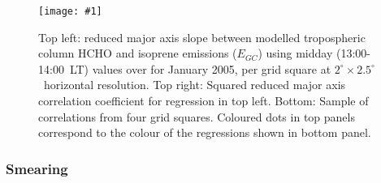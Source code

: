 \documentclass[acp, manuscript]{copernicus}
\newcommand{\apri}{E_{GC}} %
\newcommand{\lowhr}{$2^{\circ} \times 2.5^{\circ}$}
\newcommand{\mypic}[3]{%
  \begin{figure}
    \texttt{[image: \#1]}
    \caption{#2}
    #3
  \end{figure}
}
\begin{document}
    \mypic{Figures/GC/E_isop_vs_hcho_sf_200501.png}
    { %
      Top left: reduced major axis slope between modelled tropospheric column HCHO and isoprene emissions ($\apri$) using midday (13:00-14:00~LT) values over for January 2005, per grid square at \lowhr ~horizontal resolution.
      Top right: Squared reduced major axis correlation coefficient for regression in top left. 
      Bottom: Sample of correlations from four grid squares.
      Coloured dots in top panels correspond to the colour of the regressions shown in bottom panel.
    }
    {\label{BioIsop:method:slope:fig_regressions}}
    
    
    \subsubsection{Smearing}
      \label{BioIsop:method:smearing}
\end{document}
